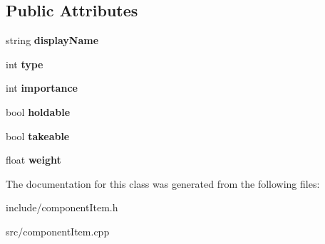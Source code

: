 \subsection*{\-Public \-Attributes}
\begin{DoxyCompactItemize}
\item 
\hypertarget{classComponentTemplateItem_a221ec90197f686dac731a19e41ef2535}{
string {\bfseries display\-Name}}
\label{d7/d46/classComponentTemplateItem_a221ec90197f686dac731a19e41ef2535}

\item 
\hypertarget{classComponentTemplateItem_a1f99b539350496b73d9393cd8c6d2bff}{
int {\bfseries type}}
\label{d7/d46/classComponentTemplateItem_a1f99b539350496b73d9393cd8c6d2bff}

\item 
\hypertarget{classComponentTemplateItem_a18211ded3cfff054b537ddf9cd7ac90b}{
int {\bfseries importance}}
\label{d7/d46/classComponentTemplateItem_a18211ded3cfff054b537ddf9cd7ac90b}

\item 
\hypertarget{classComponentTemplateItem_a235cb523d40fac2659ca516d564c96de}{
bool {\bfseries holdable}}
\label{d7/d46/classComponentTemplateItem_a235cb523d40fac2659ca516d564c96de}

\item 
\hypertarget{classComponentTemplateItem_aaa939ac55bbb9441ce3eaf35b5f04ca1}{
bool {\bfseries takeable}}
\label{d7/d46/classComponentTemplateItem_aaa939ac55bbb9441ce3eaf35b5f04ca1}

\item 
\hypertarget{classComponentTemplateItem_ab34292faff29708b5c29134086638d6f}{
float {\bfseries weight}}
\label{d7/d46/classComponentTemplateItem_ab34292faff29708b5c29134086638d6f}

\end{DoxyCompactItemize}


\-The documentation for this class was generated from the following files\-:\begin{DoxyCompactItemize}
\item 
include/component\-Item.\-h\item 
src/component\-Item.\-cpp\end{DoxyCompactItemize}
